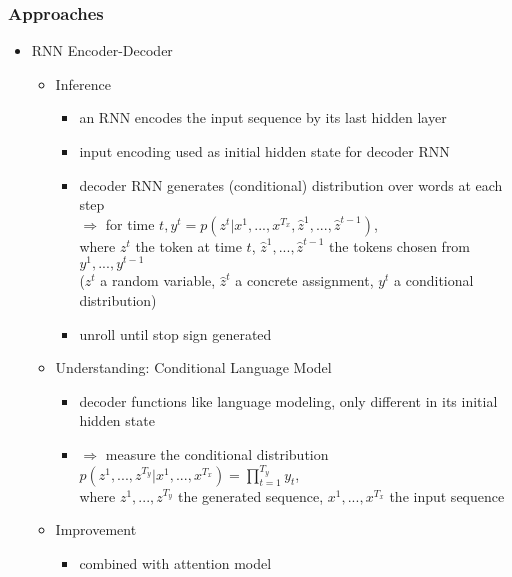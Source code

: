 \subsubsection{Approaches}
\begin{itemize}
\item RNN Encoder-Decoder
	\begin{itemize}
	\item Inference
		\begin{itemize}
		\item an RNN encodes the input sequence by its last hidden layer
		\item input encoding used as initial hidden state for decoder RNN
		\item decoder RNN generates (conditional) distribution over words at each step \\
		$\Rightarrow$ for time $t, y^t = p(z^t|x^1,...,x^{T_x}, \hat{z}^1,...,\hat{z}^{t-1})$, \\
		where $z^t$ the token at time $t$, $\hat{z}^1,...,\hat{z}^{t-1}$ the tokens chosen from $y^1,...,y^{t-1}$ \\
		($z^t$ a random variable, $\hat{z}^t$ a concrete assignment, $y^t$ a conditional distribution)
		\item unroll until stop sign generated
		\end{itemize}
	\item Understanding: Conditional Language Model
		\begin{itemize}
		\item decoder functions like language modeling, only different in its initial hidden state
		\item $\Rightarrow$ measure the conditional distribution $\displaystyle p(z^1,...,z^{T_y}|x^1,...,x^{T_x})=\prod_{t=1}^{T_y}y_t$, \\
		where $z^1,...,z^{T_y}$ the generated sequence, $x^1,...,x^{T_x}$ the input sequence
		\end{itemize}
	\item Improvement
		\begin{itemize}
		\item combined with attention model
		\end{itemize}
	\end{itemize}
	

\end{itemize}
